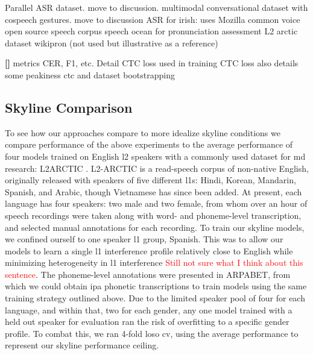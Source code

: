 \documentclass[thesis]{cluu}
\newcounter{paranum}
\newcommand{\numberedparagraph}{\par\refstepcounter{paranum}\textbf{[\theparanum] }}
\newcommand{\todo}[1]{\textcolor{red}{#1}}
\begin{document}
\textcite{conneauFLEURSFewshotLearning2022} Parallel ASR dataset. move to discussion.
\textcite{deichlerMMConvMultimodalConversational2024} multimodal conversational dataset with cospeech gestures. move to discussion
\textcite{qianAutomaticSpeechRecognition2022} ASR for irish: uses Mozilla common voice
\textcite{zhangSpeechocean762OpenSourceNonnative2021} open source speech corpus speech ocean for pronunciation assessment
\textcite{zhaoL2ARCTICNonnativeEnglish2018} L2 arctic dataset
\textcite{leeMassivelyMultilingualPronunciation} wikipron (not used but illustrative as a reference)
\numberedparagraph{metrics CER, F1, etc. Detail CTC loss used in training}
CTC loss \textcite{gravesConnectionistTemporalClassification} also details some peakiness
\textcite{kurzingerCTCSegmentationLargeCorpora2020} ctc and dataset bootstrapping

\subsection{Skyline Comparison}
To see how our approaches compare to more idealize skyline conditions we compare performance of the above experiments to the average performance of four models trained on English \gls{l2} speakers with a commonly used dataset for \gls{md} research: L2ARCTIC \parencite{zhaoL2ARCTICNonnativeEnglish2018}. L2-ARCTIC is a read-speech corpus of non-native English, originally released with speakers of five different \glspl{l1}: Hindi, Korean, Mandarin, Spanish, and Arabic, though Vietnamese has since been added. At present, each language has four speakers: two male and two female, from whom over an hour of speech recordings were taken along with word- and phoneme-level transcription, and selected manual annotations for each recording. 
To train our skyline models, we confined ourself to one speaker \gls{l1} group, Spanish. This was to allow our models to learn a single \gls{l1} interference profile relatively close to English while minimizing heterogeneity in \gls{l1} interference \todo{Still not sure what I think about this sentence}. The phoneme-level annotations were presented in ARPABET, from which we could obtain \gls{ipa} phonetic transcriptions to train models using the same training strategy outlined above. Due to the limited speaker pool of four for each language, and within that, two for each gender, any one model trained with a held out speaker for evaluation ran the risk of overfitting to a specific gender profile. To combat this, we ran 4-fold \gls{loso} \gls{cv}, using the average performance to represent our skyline performance ceiling.
\end{document}
